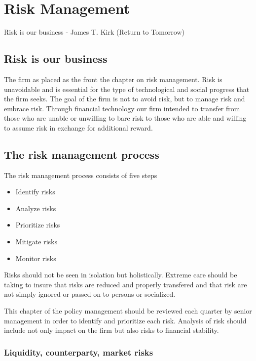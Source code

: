 \chapter{Risk Management}

Risk is our business - James T. Kirk (Return to Tomorrow)

\section{Risk is our business}
The firm as placed as the front the chapter on risk management.  Risk
is unavoidable and is essential for the type of technological and
social progress that the firm seeks.  The goal of the firm is not to
avoid risk, but to manage risk and embrace risk.  Through financial
technology our firm intended to transfer from those who are unable or
unwilling to bare risk to those who are able and willing to assume
risk in exchange for additional reward.

\section{The risk management process}

The risk management process consists of five steps
\begin{itemize}
\item Identify risks
\item Analyze risks
\item Prioritize risks
\item Mitigate risks
\item Monitor risks
\end{itemize}

Risks should not be seen in isolation but holistically.  Extreme care
should be taking to insure that risks are reduced and properly
transfered and that risk are not simply ignored or passed on to
persons or socialized.

This chapter of the policy management should be reviewed each quarter
by senior management in order to identify and prioritize each risk.
Analysis of risk should include not only impact on the firm but also
risks to financial stability.

\subsection{Liquidity, counterparty, market risks}

